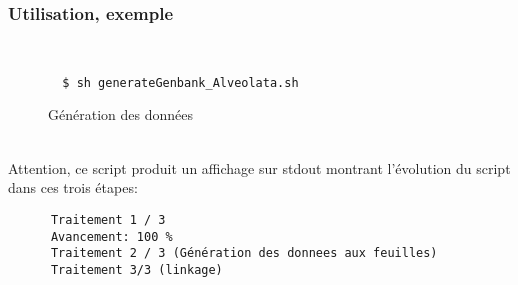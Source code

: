 \subsubsection{Utilisation, exemple}

~\\
\begin{figure}[H]
\begin{center}
\begin{verbatim}
  $ sh generateGenbank_Alveolata.sh 
  \end{verbatim}
\end{center}
\caption{Génération des données}
\end{figure}
~\\


Attention, ce script produit un affichage sur stdout montrant l'évolution du script dans ces trois étapes:

\begin{verbatim}
      Traitement 1 / 3
      Avancement: 100 %
      Traitement 2 / 3 (Génération des donnees aux feuilles)
      Traitement 3/3 (linkage)
\end{verbatim}

